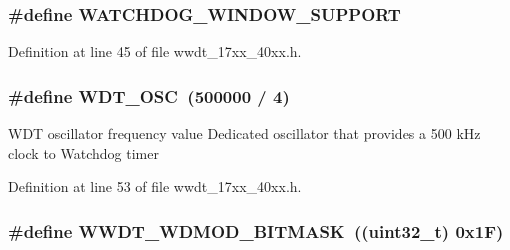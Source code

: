 \subsubsection[{\texorpdfstring{W\+A\+T\+C\+H\+D\+O\+G\+\_\+\+W\+I\+N\+D\+O\+W\+\_\+\+S\+U\+P\+P\+O\+RT}{WATCHDOG_WINDOW_SUPPORT}}]{\setlength{\rightskip}{0pt plus 5cm}\#define W\+A\+T\+C\+H\+D\+O\+G\+\_\+\+W\+I\+N\+D\+O\+W\+\_\+\+S\+U\+P\+P\+O\+RT}\hypertarget{group__WWDT__17XX__40XX_gafd5360b2cfcfe4271a608b6c90bcea5f}{}\label{group__WWDT__17XX__40XX_gafd5360b2cfcfe4271a608b6c90bcea5f}


Definition at line 45 of file wwdt\+\_\+17xx\+\_\+40xx.\+h.

\subsubsection[{\texorpdfstring{W\+D\+T\+\_\+\+O\+SC}{WDT_OSC}}]{\setlength{\rightskip}{0pt plus 5cm}\#define W\+D\+T\+\_\+\+O\+SC~(500000 / 4)}\hypertarget{group__WWDT__17XX__40XX_ga628282c7bf5c28d5a859e4915c62b643}{}\label{group__WWDT__17XX__40XX_ga628282c7bf5c28d5a859e4915c62b643}
W\+DT oscillator frequency value Dedicated oscillator that provides a 500 k\+Hz clock to Watchdog timer 

Definition at line 53 of file wwdt\+\_\+17xx\+\_\+40xx.\+h.

\subsubsection[{\texorpdfstring{W\+W\+D\+T\+\_\+\+W\+D\+M\+O\+D\+\_\+\+B\+I\+T\+M\+A\+SK}{WWDT_WDMOD_BITMASK}}]{\setlength{\rightskip}{0pt plus 5cm}\#define W\+W\+D\+T\+\_\+\+W\+D\+M\+O\+D\+\_\+\+B\+I\+T\+M\+A\+SK~((uint32\+\_\+t) 0x1\+F)}\hypertarget{group__WWDT__17XX__40XX_gac9ba0cf06012012875985842cabb5a11}{}\label{group__WWDT__17XX__40XX_gac9ba0cf06012012875985842cabb5a11}


